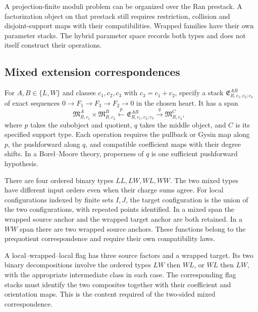 \begin{remark}
\label{rem:two-strata-two-registers}
A projection-finite moduli problem can be organized over the Ran
prestack.  A factorization object on that prestack still requires
restriction, collision and disjoint-support maps with their
compatibilities.  Wrapped families have their own parameter stacks.
The hybrid parameter space records both types and does not itself
construct their operations.
\end{remark}

\subsection{Mixed extension correspondences}
\label{subsec:mixed-correspondences}

\begin{definition}
\label{def:mixed-correspondences}
For $A,B\in\{L,W\}$ and classes $c_1,c_2,c_3$ with
$c_3=c_1+c_2$, specify a stack $\mathfrak E^{AB}_{R,c_1,c_2;c_3}$
of exact sequences $0\to F_1\to F_3\to F_2\to0$ in the chosen
heart.  It has a span
\[
\mathfrak M^A_{R,c_1}\times\mathfrak M^B_{R,c_2}
\xleftarrow{\ p\ }
\mathfrak E^{AB}_{R,c_1,c_2;c_3}
\xrightarrow{\ q\ }\mathfrak M^C_{R,c_3},
\]
where $p$ takes the subobject and quotient, $q$ takes the middle
object, and $C$ is its specified support type.
Each operation requires the pullback or Gysin map along $p$, the
pushforward along $q$, and compatible coefficient maps with their
degree shifts.  In a Borel--Moore theory, properness of $q$ is one
sufficient pushforward hypothesis.
\end{definition}

There are four ordered binary types $LL,LW,WL,WW$.  The two mixed
types have different input orders even when their charge sums agree.
For local configurations indexed by finite sets $I,J$, the target
configuration is the union of the two configurations, with repeated
points identified.  In a mixed span the wrapped source anchor and
the wrapped target anchor are both retained.  In a $WW$ span there
are two wrapped source anchors.  These functions belong to the
prequotient correspondence and require their own compatibility laws.

A local--wrapped--local flag has three source factors and a wrapped
target.  Its two binary decompositions involve the ordered types
$LW$ then $WL$, or $WL$ then $LW$, with the appropriate intermediate
class in each case.  The corresponding flag stacks must identify the
two composites together with their coefficient and orientation maps.
This is the content required of the two-sided mixed correspondence.

